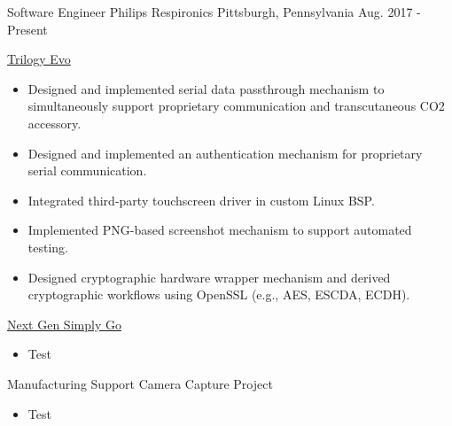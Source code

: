 

\begin{cventries}

\cventry
  {Software Engineer} %
  {Philips Respironics} %
  {Pittsburgh, Pennsylvania} %
  {Aug. 2017 - Present} %
  {
    \begin{cvitems}
    \item
    {
      \href{https://www.usa.philips.com/healthcare/product/HC0055500/trilogy-evo-portable-hospital-to-home-ventilator}{\color{RoyalBlue}Trilogy Evo}
      \begin{itemize}
        \item Designed and implemented serial data passthrough mechanism to simultaneously support proprietary communication and transcutaneous CO2 accessory.
        \item Designed and implemented an authentication mechanism for proprietary serial communication.
        \item Integrated third-party touchscreen driver in custom Linux BSP.
        \item Implemented PNG-based screenshot mechanism to support automated testing.
        \item Designed cryptographic hardware wrapper mechanism and derived cryptographic workflows using OpenSSL (e.g., AES, ESCDA, ECDH).
      \end{itemize}
    }
    \item
    {
      \href{https://www.usa.philips.com/healthcare/product/HCNOCTN350/simplygo-mini-portable-oxygen-concentrator-poc}{\color{RoyalBlue}Next Gen Simply Go}
      \begin{itemize}
        \item Test
      \end{itemize} 
    }
    \item
    {
      {Manufacturing Support Camera Capture Project}
      \begin{itemize}
        \item Test
      \end{itemize}
    }
    \end{cvitems}
  }

\end{cventries}
